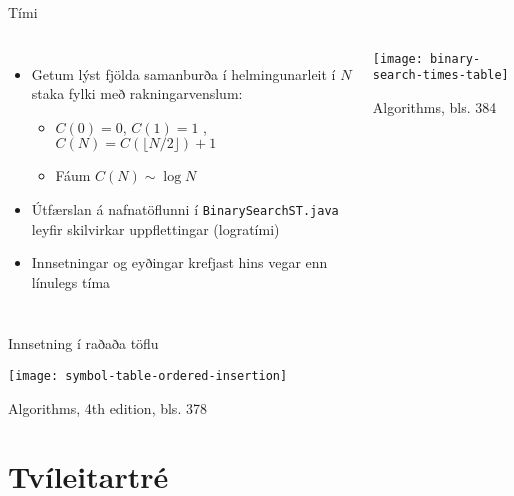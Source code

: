 \documentclass{beamer}
\begin{document}
\begin{frame}{Tími}
	\begin{columns}
		\begin{itemize}
			\item Getum lýst fjölda samanburða í helmingunarleit í $N$ staka fylki með rakningarvenslum:
			      \begin{itemize}
				      \item $C(0) = 0$, $C(1) = 1$ , $C(N) = C(\lfloor N/2 \rfloor)+1$
				      \item Fáum $C(N) \sim \log N$
			      \end{itemize}
			\item Útfærslan á nafnatöflunni í \texttt{BinarySearchST.java} leyfir skilvirkar uppflettingar (logratími)
			\item Innsetningar og eyðingar krefjast hins vegar enn línulegs tíma
		\end{itemize}
		\begin{center}
			\texttt{[image: binary-search-times-table]}

			Algorithms, bls. 384
		\end{center}
	\end{columns}
\end{frame}

\begin{frame}{Innsetning í raðaða töflu}
	\begin{center}
		\texttt{[image: symbol-table-ordered-insertion]}

		Algorithms, 4th edition, bls. 378
	\end{center}


\end{frame}

\section{Tvíleitartré}
\end{document}
